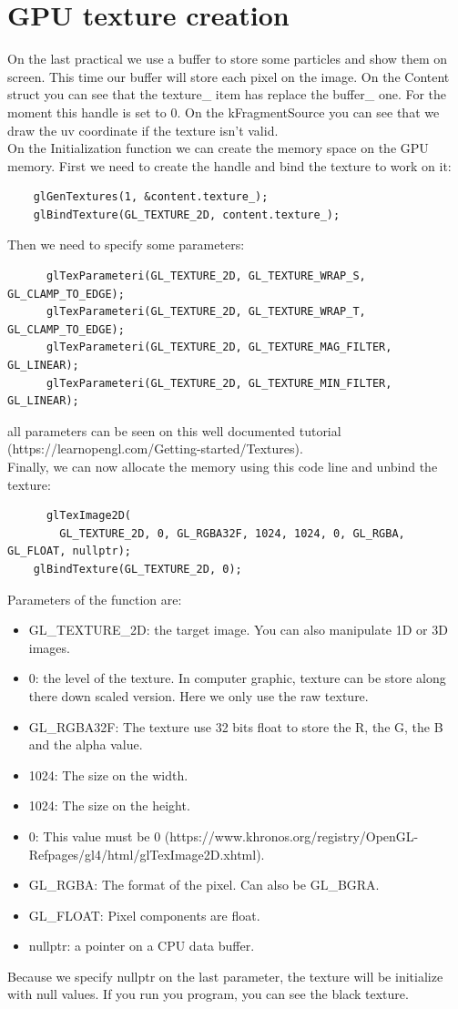 \documentclass{article}
\begin{document}
\section{GPU texture creation}
On the last practical we use a buffer to store some particles and show them on screen. This time our buffer will store each pixel on the image. On the Content struct you can see that the texture\_ item has replace the buffer\_ one. For the moment this handle is set to 0. On the kFragmentSource you can see that we draw the uv coordinate if the texture isn't valid.\\
On the Initialization function we can create the memory space on the GPU memory. First we need to create the handle and bind the texture to work on it:
\begin{lstlisting}
	glGenTextures(1, &content.texture_);
	glBindTexture(GL_TEXTURE_2D, content.texture_);
\end{lstlisting}
Then we need to specify some parameters:
\begin{lstlisting}
	  glTexParameteri(GL_TEXTURE_2D, GL_TEXTURE_WRAP_S, GL_CLAMP_TO_EDGE);
	  glTexParameteri(GL_TEXTURE_2D, GL_TEXTURE_WRAP_T, GL_CLAMP_TO_EDGE);
	  glTexParameteri(GL_TEXTURE_2D, GL_TEXTURE_MAG_FILTER, GL_LINEAR);
	  glTexParameteri(GL_TEXTURE_2D, GL_TEXTURE_MIN_FILTER, GL_LINEAR);
\end{lstlisting}
all parameters can be seen on this well documented tutorial (https://learnopengl.com/Getting-started/Textures).\\
Finally, we can now allocate the memory using this code line and unbind the texture:
\begin{lstlisting}
	  glTexImage2D(
		GL_TEXTURE_2D, 0, GL_RGBA32F, 1024, 1024, 0, GL_RGBA, GL_FLOAT, nullptr);
	glBindTexture(GL_TEXTURE_2D, 0);
\end{lstlisting}
Parameters of the function are:
\begin{itemize}
	\item GL\_TEXTURE\_2D: the target image. You can also manipulate 1D or 3D images.
	\item 0: the level of the texture. In computer graphic, texture can be store along there down scaled version. Here we only use the raw texture.
	\item GL\_RGBA32F: The texture use 32 bits float to store the R, the G, the B and the alpha value. 
	\item 1024: The size on the width.
	\item 1024: The size on the height.
	\item 0: This value must be 0 (https://www.khronos.org/registry/OpenGL-Refpages/gl4/html/glTexImage2D.xhtml).
	\item GL\_RGBA: The format of the pixel. Can also be GL\_BGRA.
	\item GL\_FLOAT: Pixel components are float.
	\item nullptr: a pointer on a CPU data buffer.
\end{itemize}
Because we specify nullptr on the last parameter, the texture will be initialize with null values. If you run you program, you can see the black texture.
\end{document}
